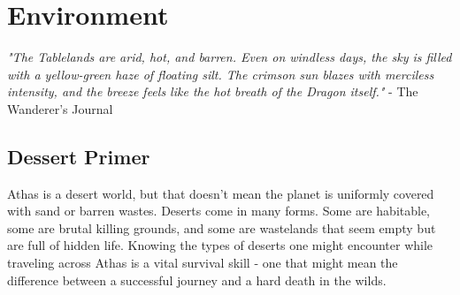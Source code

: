 \chapter{Environment}\label{chap:environment}

\textit{"The Tablelands are arid, hot, and barren. Even on windless days,
the sky is filled with a yellow-green haze of floating silt. The crimson sun
blazes with merciless intensity, and the breeze feels like the hot breath of
the Dragon itself."} - The Wanderer’s Journal\\

\section{Dessert Primer}
Athas is a desert world, but that doesn’t mean the planet is uniformly covered
with sand or barren wastes. Deserts come in many forms. Some are habitable,
some are brutal killing grounds, and some are wastelands that seem empty but
are full of hidden life. Knowing the types of deserts one might encounter
while traveling across Athas is a vital survival skill - one that might mean
the difference between a successful journey and a hard death in the wilds.

